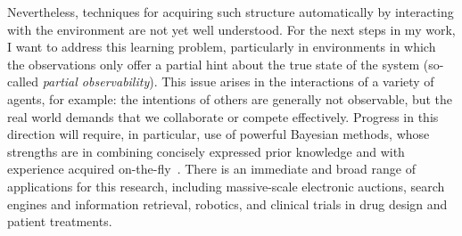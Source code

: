\documentclass[12pt]{article}
\begin{document}





Nevertheless, techniques for acquiring such structure automatically by interacting with the environment are not yet well understood. 
For the next steps in my work, I want to address this learning problem,
particularly in environments in which the observations only offer a partial hint about the true state of the system (so-called \emph{partial observability}). This issue arises in the interactions of a variety of agents, for example: the intentions of others are generally not observable, but the real world demands that we collaborate or compete effectively. Progress in this direction will require, in particular, use of powerful Bayesian methods, whose strengths are in combining concisely expressed prior knowledge and with experience acquired on-the-fly~\cite{kemp08pnas,wang06nips,martinez07rss}.
There is an immediate and broad range of applications for this research, including  massive-scale electronic auctions, search engines and information retrieval, robotics, and clinical trials in drug design and patient treatments.
\end{document}
